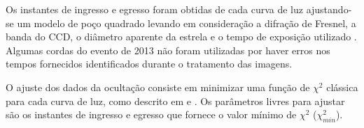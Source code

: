 \documentclass[12pt,a4paper]{report}
\begin{document}
Os instantes de ingresso e egresso foram obtidas de cada curva de luz ajustando-se um modelo de poço quadrado levando em consideração a difração de Fresnel, a banda do CCD, o diâmetro aparente da estrela e o tempo de exposição utilizado \citep[ver][]{Widemann2009, Braga-Ribas2013}. Algumas cordas do evento de 2013 não foram utilizadas por haver erros nos tempos fornecidos identificados durante o tratamento das imagens.

O ajuste dos dados da ocultação consiste em minimizar uma função de $\chi^{2}$ clássica para cada curva de luz, como descrito em \cite{Sicardy2011} e \cite{Braga-Ribas2013}. Os parâmetros livres para ajustar são os instantes de ingresso e egresso que fornece o valor mínimo de $\chi^{2}$ ($\chi^{2}_{min}$). %

\end{document}
